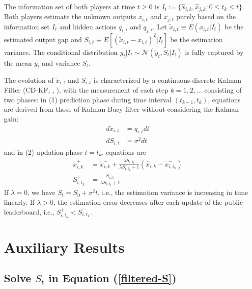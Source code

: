 \documentclass[mnsc]{informs3}
\begin{document}
\begin{APPENDICES}
The information set of both players at time $t \ge 0$ is  $I_{t} := \{\hat{x}_{i,k}, \hat{x}_{j,k} : 0\le t_k \le t\}$. 
Both players estimate the unknown outputs $x_{i,t}$ and $x_{j,t}$ purely based on the information set $I_t$ and hidden actions $q_{i,t}$ and $q_{j,t}$. 
Let $\tilde{x}_{i,t} \equiv E(x_{i,t}|I_t)$ be the estimated output gap and $S_{i,t} \equiv E[(\tilde{x}_{i,t}-x_{i,t})^2|I_t]$ be the estimation variance. 
The conditional distribution $y_{t}|I_t\sim\mathcal{N}(\tilde{y}_{t},S_{t}|I_t)$ is fully captured by the mean $\tilde{y}_{t}$ and variance $S_{t}$. 

The evolution of $\tilde{x}_{i,t}$ and $S_{i,t}$ is characterized by a continuous-discrete Kalman Filter (CD-KF, \citealt{barrau2017invariant}, \citealt{frogerais2012various}), with the measurement of each step $k=1, 2, ...$ consisting of two phases: in
(1) prediction phase during time interval $(t_{k-1}, t_{k})$, equations are derived from those of Kalman-Bucy filter \citep{Bensoussan1992Control} without considering the Kalman gain: 
\begin{align}
	d\tilde{x}_{i,t} &= q_{i,t}dt
	\label{filtered-x}\\
	dS_{i,t} &= \sigma^2dt
	\label{filtered-S}
\end{align} 
and in (2) updation phase $t=t_k$, equations are 
\begin{align}
	\tilde{x}_{i,k}^{+} &= \tilde{x}_{i,k}^{-} + \frac{\lambda S_{i,t_k}^{-}}{\lambda S_{i,t_k}^{-}+1}\left(\hat{x}_{i,k} - \tilde{x}_{i,t_k}^{-}\right)
	\label{updated-x}\\
	S_{i,t_k}^{+} &= \frac{S_{i,t_k}^{-}}{\lambda S_{i,t_k}^{-}+1} 
\end{align}
If $\lambda = 0$, we have $S_t = S_0+\sigma^2t$, i.e., the estimation variance is increasing in time linearly. 
If $\lambda > 0$, the estimation error decreases after each update of the public leaderboard, i.e., $S_{i,t_k}^+ < S_{i,t_k}^-$. 



\section{Auxiliary Results}

\subsection{Solve $S_t$ in Equation (\ref{filtered-S})}\label{app-S-equ}


\end{APPENDICES}
\end{document}
